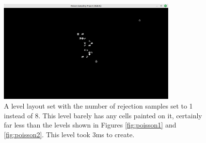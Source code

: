 \begin{figure}[H]
    \centering
    \includegraphics[width=0.8\textwidth]{Images/poisson-1-sample.png}
    \caption{A level layout set with the number of rejection samples set to 1 instead of 8. This level barely has any cells painted on it, certainly far less than the levels shown in Figures \ref{fig:poisson1} and \ref{fig:poisson2}. This level took 3ms to create.}
    \label{fig:poisson3}
\end{figure}